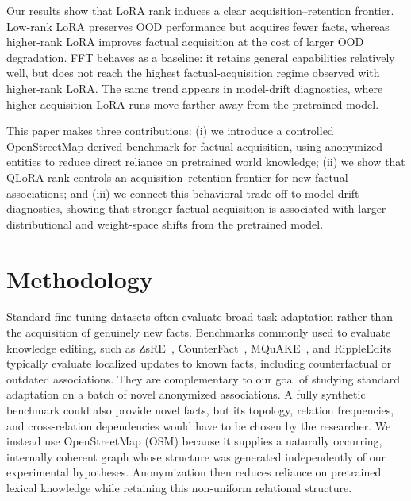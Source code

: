 \documentclass[11pt]{article}
\begin{document}
Our results show that LoRA rank induces a clear acquisition--retention
frontier. Low-rank LoRA preserves OOD performance but acquires fewer
facts,
whereas higher-rank LoRA improves factual acquisition at the cost of larger OOD
degradation.
FFT behaves as a baseline: it retains general
capabilities relatively well, but does not reach the highest factual-acquisition
regime observed with higher-rank LoRA. The same trend appears in model-drift
diagnostics, where higher-acquisition LoRA runs move farther away from the
pretrained model.

This paper makes three contributions: (i) we introduce a controlled
OpenStreetMap-derived benchmark for factual acquisition, using anonymized
entities to reduce direct reliance on pretrained world knowledge; 
(ii) we show
that QLoRA rank controls an acquisition--retention frontier for new factual
associations; 
and (iii) we connect this behavioral trade-off to model-drift
diagnostics, showing that stronger factual acquisition is associated with
larger distributional and weight-space shifts from the pretrained model.

\section{Methodology}
\label{sec:methodology}



Standard fine-tuning datasets often evaluate broad task adaptation rather than
the acquisition of genuinely new facts. Benchmarks commonly used to evaluate
knowledge editing, such as
ZsRE~\cite{levy-etal-2017-zero}, CounterFact~\cite{meng2022locating},
MQuAKE~\cite{zhong-etal-2023-mquake}, and
RippleEdits~\cite{cohen-etal-2024-evaluating} typically evaluate localized
updates to known facts, including counterfactual or outdated associations. They
are complementary to our goal of studying standard adaptation on a batch of
novel anonymized associations. A fully synthetic benchmark could also provide
novel facts, but its topology, relation frequencies, and cross-relation
dependencies would have to be chosen by the researcher. We instead use
OpenStreetMap (OSM) because it supplies a naturally occurring, internally
coherent graph whose structure was generated independently of our experimental
hypotheses. Anonymization then reduces reliance on pretrained lexical knowledge
while retaining this non-uniform relational structure.
\end{document}
